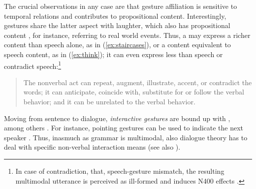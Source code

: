 \documentclass[output=paper]{langsci/langscibook}
\begin{document}
The crucial observations in any case are that gesture affiliation is sensitive to temporal relations \citetext{supplemented by prosodic and also semantic information, as argued by \citealp{Alahverdzhieva:Lascarides:Flickinger:2017}, amongst others} and contributes to propositional content.
%
Interestingly, gestures share the latter aspect with laughter, which also has propositional content \citep{Ginzburg:Breitholz:Cooper:Hough:Tian:2015}, for instance, referring to real world events.
%
Thus, a  may express a richer content than speech alone, as in (\ref{ex:staircases}), or a content equivalent to speech content, as in (\ref{ex:think}); it can even express less than speech or contradict speech:\footnote{In case of contradiction, that, speech-gesture mismatch, the resulting multimodal utterance is perceived as ill-formed and induces N400 effects \citep{Wu:Coulson:2005,Kelly:Kravitz:Hopkins:2004}.} 
%
\begin{quote}
The nonverbal act can repeat, augment, illustrate, accent, or contradict the words; it can anticipate, coincide with, substitute for or follow the verbal behavior; and it can be unrelated to the verbal behavior.\hfill 
\citep[53]{Ekman:Friesen:1969}
\end{quote}


Moving from sentence to dialogue, \emph{interactive gestures}  are bound up with , among others \citep{Bavelas:Chovil:Lawrie:Wade:1992,Bavelas:Chovil:Coates:Roe:1995}.
%
For instance, pointing gestures can be used to indicate the next speaker \citep{Rieser:Poesio:2009}. 
%
Thus, inasmuch as grammar is multimodal, also dialogue theory has to deal with specific non-verbal interaction means (see also ).
\end{document}

